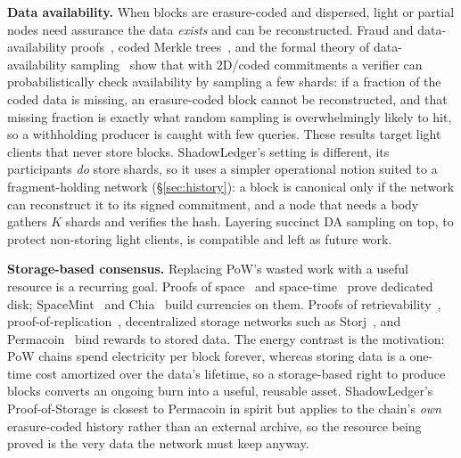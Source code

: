 \textbf{Data availability.} When blocks are erasure-coded and dispersed, light or partial
nodes need assurance the data \emph{exists} and can be reconstructed. Fraud and
data-availability proofs~\cite{albassam2021fraud}, coded Merkle trees~\cite{yu2020coded}, and
the formal theory of data-availability sampling~\cite{hallandersen2025foundations,hallandersen2024frida}
show that with $2$D/coded commitments a verifier can probabilistically check availability by
sampling a few shards: if a fraction of the coded data is missing, an erasure-coded block cannot
be reconstructed, and that missing fraction is exactly what random sampling is overwhelmingly
likely to hit, so a withholding producer is caught with few queries. These results target
light clients that never store blocks. ShadowLedger's setting is different, its participants
\emph{do} store shards, so it uses a simpler operational notion suited to a fragment-holding
network (\S\ref{sec:history}): a block is canonical only if the network can reconstruct it to its
signed commitment, and a node that needs a body gathers $K$ shards and verifies the hash. Layering
succinct DA sampling on top, to protect non-storing light clients, is compatible and left as
future work.

\textbf{Storage-based consensus.} Replacing PoW's wasted work with a useful resource is a
recurring goal. Proofs of space~\cite{dziembowski2015proofs} and
space-time~\cite{moran2019simple} prove dedicated disk; SpaceMint~\cite{park2018spacemint} and
Chia~\cite{cohen2019chia} build currencies on them. Proofs of
retrievability~\cite{juels2007pors}, proof-of-replication~\cite{fisch2018scaling},
decentralized storage networks such as Storj~\cite{wilkinson2016storj}, and
Permacoin~\cite{miller2014permacoin} bind rewards to stored data. The energy contrast is the
motivation: PoW chains spend electricity per block forever, whereas storing data is a one-time
cost amortized over the data's lifetime, so a storage-based right to produce blocks converts an
ongoing burn into a useful, reusable asset. ShadowLedger's Proof-of-Storage is closest to Permacoin
in spirit but applies to the chain's \emph{own} erasure-coded history rather than an external
archive, so the resource being proved is the very data the network must keep anyway.
